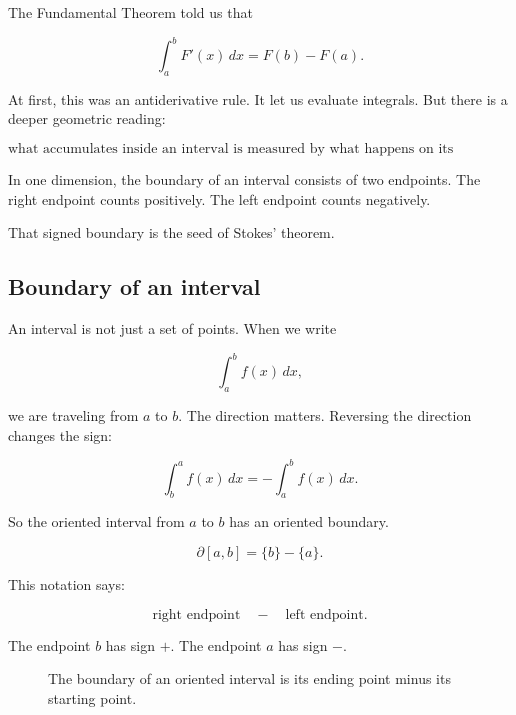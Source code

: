 The Fundamental Theorem told us that

\[
\int_a^b F'(x)\,dx=F(b)-F(a).
\]

At first, this was an antiderivative rule.  It let us evaluate integrals.  But there is a
deeper geometric reading:

\[
\boxed{
\text{what accumulates inside an interval is measured by what happens on its boundary.}
}
\]

In one dimension, the boundary of an interval consists of two endpoints.  The right
endpoint counts positively.  The left endpoint counts negatively.

That signed boundary is the seed of Stokes' theorem.

\subsection{Boundary of an interval}
\label{subsec:boundary-of-interval}

An interval is not just a set of points.  When we write

\[
\int_a^b f(x)\,dx,
\]

we are traveling from \(a\) to \(b\).  The direction matters.  Reversing the direction
changes the sign:

\[
\int_b^a f(x)\,dx=-\int_a^b f(x)\,dx.
\]

So the oriented interval from \(a\) to \(b\) has an oriented boundary.

\[
\boxed{
\partial[a,b]=\{b\}-\{a\}.
}
\]

This notation says:

\[
\text{right endpoint} \quad - \quad \text{left endpoint}.
\]

The endpoint \(b\) has sign \(+\).  The endpoint \(a\) has sign \(-\).

\begin{figure}[h]
\centering
{}
\caption{The boundary of an oriented interval is its ending point minus its starting point.}
\label{fig:oriented-interval-boundary}
\end{figure}

